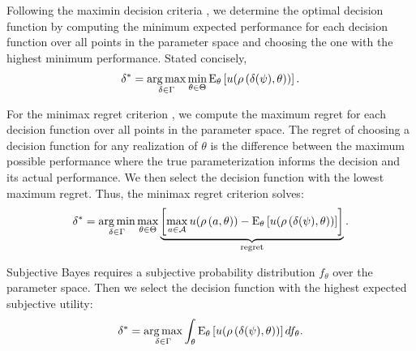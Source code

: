 Following the maximin decision criteria \citep{Gilboa.1989,Wald.1950}, we determine the optimal decision function by computing the minimum expected performance for each decision function over all points in the parameter space and choosing the one with the highest minimum performance. Stated concisely,
%
\begin{align*}
\delta^*= \operatorname*{arg\,max}_{\delta \in \Gamma } \min_{\theta\in \Theta} \mathrm{E}_{\theta}\left[u(\rho\left(\delta(\psi), \theta\right))\right].
\end{align*}

For the minimax regret criterion \citep{Manski.2004,Niehans.1948}, we compute the maximum regret for each decision function over all points in the parameter space. The regret of choosing a decision function for any realization of $\theta$ is the difference between the maximum possible performance where the true parameterization informs the decision and its actual performance. We then select the decision function with the lowest maximum regret. Thus, the minimax regret criterion solves:
%
\begin{align*}
\delta^* =  \operatorname*{arg\,min}_{\delta \in \Gamma } \max_{\theta\in \Theta}  \underbrace{\left[\max_{a \in \mathcal{A}}  u(\rho\left(a, \theta\right))  - \mathrm{E}_{\theta}\left[u(\rho\left(\delta(\psi), \theta\right)) \right]\right]}_{\text{regret}}.
\end{align*}

Subjective Bayes \citep{Savage.1954} requires a subjective probability distribution $f_{\theta}$ over the parameter space. Then we select the decision function with the highest expected subjective utility:
%
\begin{align*}
\delta^* = \operatorname*{arg\,max}_{\delta \in \Gamma }  \int_{\theta} \mathrm{E}_{\theta}\left[u(\rho\left(\delta(\psi), \theta\right))\right]df_{\theta}.
\end{align*}
